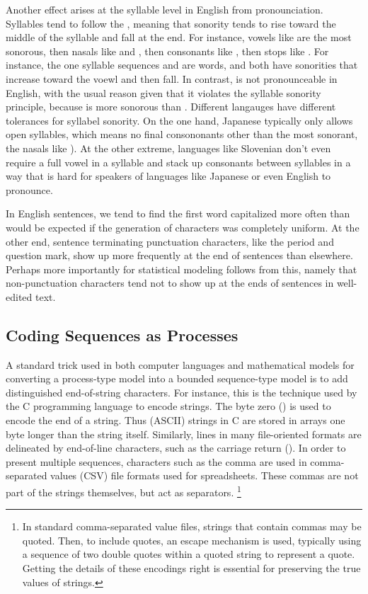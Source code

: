 Another effect arises at the syllable level in English from
pronounciation.  Syllables tend to follow the , meaning that sonority tends to rise toward the middle of
the syllable and fall at the end.  For instance, vowels like
 are the most sonorous, then nasals like
 and , then consonants like
, then stops like .  For instance, the
one syllable sequences  and 
are words, and both have sonorities that increase toward the voewl and
then fall.  In contrast,  is not pronounceable in
English, with the usual reason given that it violates the syllable
sonority principle, because  is more sonorous than
.  Different langauges have different tolerances for
syllabel sonority.  On the one hand, Japanese typically only allows
open syllables, which means no final consononants other than the most
sonorant, the nasals like ).  At the other extreme,
languages like Slovenian don't even require a full vowel in a syllable
and stack up consonants between syllables in a way that is hard for
speakers of languages like Japanese or even English to pronounce.

In English sentences, we tend to find the first word capitalized more
often than would be expected if the generation of characters was
completely uniform.  At the other end, sentence terminating
punctuation characters, like the period and question mark, show up
more frequently at the end of sentences than elsewhere.  Perhaps more
importantly for statistical modeling follows from this, namely that
non-punctuation characters tend not to show up at the ends of
sentences in well-edited text.

\subsection{Coding Sequences as Processes}

A standard trick used in both computer languages and mathematical
models for converting a process-type model into a bounded
sequence-type model is to add distinguished end-of-string characters.
For instance, this is the technique used by the C programming language
to encode strings.  The byte zero () is used to encode the
end of a string.  Thus (ASCII) strings in C are stored in arrays one
byte longer than the string itself.  Similarly, lines in many
file-oriented formats are delineated by end-of-line characters, such
as the carriage return ().  In order to present multiple
sequences, characters such as the comma are used in comma-separated
values (CSV) file formats used for spreadsheets.  These commas are not
part of the strings themselves, but act as separators.%
%
\footnote{In standard comma-separated value files, strings that
  contain commas may be quoted.  Then, to include quotes, an escape
  mechanism is used, typically using a sequence of two double quotes
  within a quoted string to represent a quote.  Getting the details of
  these encodings right is essential for preserving the true values of
  strings.}

